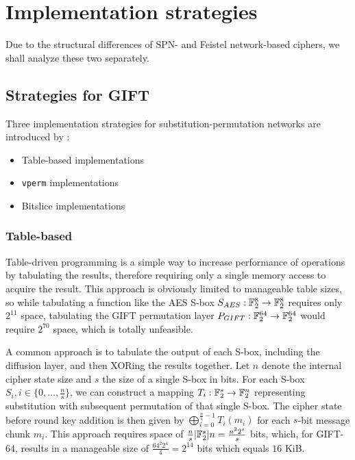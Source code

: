 \chapter{Implementation strategies}

Due to the structural differences of SPN- and Feistel network-based ciphers, we
shall analyze these two separately.

\section{Strategies for GIFT}

Three implementation strategies for substitution-permutation networks are
introduced by \cite{implx86:2014}:

\begin{itemize}
    \item Table-based implementations
    \item \texttt{vperm} implementations
    \item Bitslice implementations
\end{itemize}

\subsection{Table-based}

Table-driven programming is a simple way to increase performance of operations
by tabulating the results, therefore requiring only a single memory access to
acquire the result. This approach is obviously limited to manageable table
sizes, so while tabulating a function like the AES S-box
$S_{AES}:\mathbb{F}_2^{8}\rightarrow \mathbb{F}_2^{8}$ requires only $2^{11}$ space, tabulating the
GIFT permutation layer $P_{GIFT}:\mathbb{F}_2^{64}\rightarrow \mathbb{F}_2^{64}$ would require
$2^{70}$ space, which is totally unfeasible.

A common approach is to tabulate the output of each S-box, including the
diffusion layer, and then XORing the results together. Let $n$ denote the
internal cipher state size and $s$ the size of a single S-box in bits. For each
S-box $S_i,i\in\{0,\dots,\frac{n}{s}\}$, we can construct a mapping
$T_i:\mathbb{F}_2^{s}\rightarrow \mathbb{F}_2^{n}$ representing substitution with subsequent
permutation of that single S-box. The cipher state before round key addition is
then given by $\bigoplus_{i=0}^{\frac{n}{s}-1}{T_i(m_i)}$ for each $s$-bit
message chunk $m_i$. This approach requires space of
$\frac{n}{s}|\mathbb{F}_2^{s}|n=\frac{n^2 2^s}{s}$ bits, which, for GIFT-64,
results in a manageable size of $\frac{64^2 2^4}{4}=2^{14}$ bits which equals
$16$ KiB.

